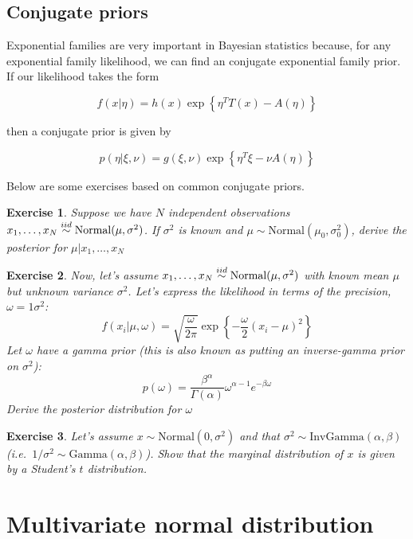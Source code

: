 \documentclass[twoside]{article}
\newcounter{lecnum}
\newtheorem{exercise}{Exercise}[lecnum]
\begin{document}
\subsection{Conjugate priors}

Exponential families are very important in Bayesian statistics because, for any exponential family likelihood, we can find an conjugate exponential family prior. If our likelihood takes the form

$$f(x|\eta) = h(x)\exp\left\{\eta^TT(x) - A(\eta)\right\}$$

then a conjugate prior is given by

$$p(\eta|\xi,\nu) = g(\xi,\nu)\exp\left\{\eta^T\xi - \nu A(\eta)\right\}$$

Below are some exercises based on common conjugate priors.

\begin{exercise}
  Suppose we have $N$ independent observations $x_1,\dots, x_N \stackrel{\small{iid}}{\sim}\mbox{Normal}(\mu, \sigma^2)$. If $\sigma^2$ is known and $\mu\sim \mbox{Normal}(\mu_0,\sigma_0^2)$, derive the posterior for $\mu|x_1,\dots, x_N$
\end{exercise}

\begin{exercise}
  Now, let's assume  $x_1,\dots, x_N \stackrel{\small{iid}}{\sim}\mbox{Normal}(\mu, \sigma^2)$ with known mean $\mu$ but unknown variance $\sigma^2$. Let's express the likelihood in terms of the precision, $\omega=1\sigma^2$:
  $$f(x_i|\mu, \omega) = \sqrt{\frac{\omega}{2\pi}} \exp\left\{-\frac{\omega}{2}(x_i-\mu)^2\right\}$$
  Let $\omega$ have a gamma prior (this is also known as putting an inverse-gamma prior on $\sigma^2$):
  $$p(\omega) = \frac{\beta^\alpha}{\Gamma(\alpha)}\omega^{\alpha-1}e^{-\beta \omega}$$
  Derive the posterior distribution for $\omega$
\end{exercise}

\begin{exercise}
  Let's assume $x \sim \mbox{Normal}(0, \sigma^2)$ and that $\sigma^2\sim\mbox{InvGamma}(\alpha,\beta)$ (i.e.\ $1/\sigma^2 \sim \mbox{Gamma}(\alpha,\beta)$). Show that the marginal distribution of $x$ is given by a Student's $t$ distribution.
\end{exercise}

\section{Multivariate normal distribution}
\end{document}
